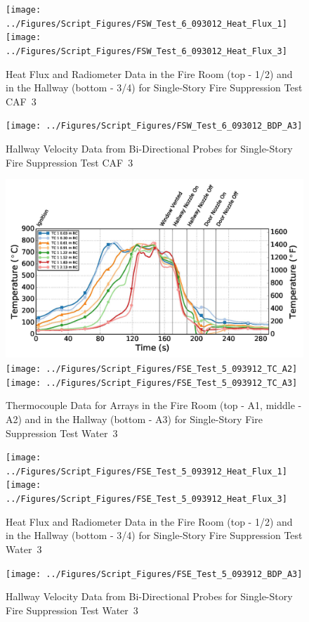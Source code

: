 \documentclass[12pt,oneside]{book}
\begin{document}
\begin{figure}[ht]
\texttt{[image: ../Figures/Script\_Figures/FSW\_Test\_6\_093012\_Heat\_Flux\_1]}
\texttt{[image: ../Figures/Script\_Figures/FSW\_Test\_6\_093012\_Heat\_Flux\_3]}
\caption{Heat Flux and Radiometer Data in the Fire Room (top - 1/2) and in the Hallway (bottom - 3/4) for Single-Story Fire Suppression Test CAF~3}
\end{figure}

\begin{figure}[ht]
\texttt{[image: ../Figures/Script\_Figures/FSW\_Test\_6\_093012\_BDP\_A3]}
\caption{Hallway Velocity Data from Bi-Directional Probes for Single-Story Fire Suppression Test CAF~3}
\end{figure}

\begin{figure}[ht]
\includegraphics[width=.725\columnwidth]{../Figures/Script_Figures/FSE_Test_5_093912_TC_A1}
\texttt{[image: ../Figures/Script\_Figures/FSE\_Test\_5\_093912\_TC\_A2]}
\texttt{[image: ../Figures/Script\_Figures/FSE\_Test\_5\_093912\_TC\_A3]}
\caption{Thermocouple Data for Arrays in the Fire Room (top - A1, middle - A2) and in the Hallway (bottom - A3) for Single-Story Fire Suppression Test Water~3}
\end{figure}

\begin{figure}[ht]
\texttt{[image: ../Figures/Script\_Figures/FSE\_Test\_5\_093912\_Heat\_Flux\_1]}
\texttt{[image: ../Figures/Script\_Figures/FSE\_Test\_5\_093912\_Heat\_Flux\_3]}
\caption{Heat Flux and Radiometer Data in the Fire Room (top - 1/2) and in the Hallway (bottom - 3/4) for Single-Story Fire Suppression Test Water~3}
\end{figure}

\begin{figure}[ht]
\texttt{[image: ../Figures/Script\_Figures/FSE\_Test\_5\_093912\_BDP\_A3]}
\caption{Hallway Velocity Data from Bi-Directional Probes for Single-Story Fire Suppression Test Water~3}
\end{figure}
\end{document}
